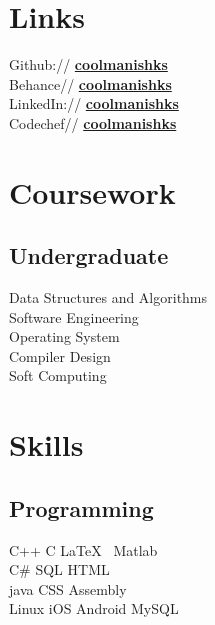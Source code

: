 \documentclass[a4paper]{manish-resume} %
\begin{document}
\begin{minipage}[t]{0.33\textwidth}
\section{Links} 

Github:// \href{https://github.com/coolmanishks}{\bf coolmanishks} \\
Behance// \href{https://www.behance.net/coolmanishks}{\bf coolmanishks}\\
LinkedIn:// \href{https://www.linkedin.com/coolmanishks}{\bf coolmanishks} \\
Codechef// \href{https://www.codechef.com/users/coolmanishks}{\bf coolmanishks}\\

\sectionspace %


\section{Coursework}

\subsection{Undergraduate}

Data Structures and Algorithms \\
Software Engineering \\
Operating System \\
Compiler Design \\
Soft Computing\\

\sectionspace %



\section{Skills}

\subsection{Programming}

C++ \textbullet{} C \textbullet{} \LaTeX\  \textbullet{} Matlab \\
C\# \textbullet{} SQL \textbullet{} HTML \\ 
java \textbullet{}  CSS \textbullet{} Assembly \\
Linux \textbullet{} iOS \textbullet{} Android \textbullet{} MySQL
\sectionspace

\end{minipage}
\end{document}
